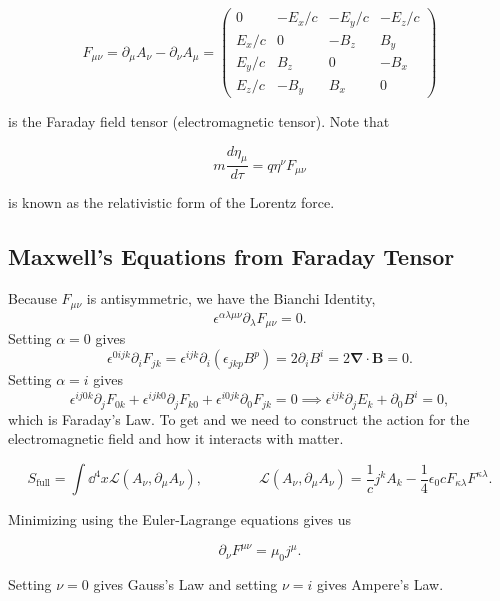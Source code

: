 \documentclass{article}
\numberwithin{equation}{subsection}
\begin{document}
\begin{meq}
    \begin{equation}
        F_{\mu\nu} = \partial_\mu A_\nu - \partial_\nu A_\mu = \begin{pmatrix}
            0  & -E_x/c & -E_y/c & -E_z/c \\
            E_x/c & 0 & -B_z & B_y \\
            E_y/c & B_z & 0 & -B_x \\
            E_z/c & -B_y & B_x & 0
        \end{pmatrix}
    \end{equation}
\end{meq}
is the Faraday field tensor (electromagnetic tensor). Note that
\begin{meq}
    \begin{equation}
        m\frac{d\eta_\mu}{d\tau} = q\eta^\nu F_{\mu\nu}
    \end{equation}
\end{meq}
is known as the relativistic form of the Lorentz force.
\subsection{Maxwell's Equations from Faraday Tensor}
Because $F_{\mu\nu}$ is antisymmetric, we have the Bianchi Identity,
\begin{equation*}
    \epsilon^{\alpha\lambda\mu\nu}\partial_\lambda F_{\mu\nu} = 0.
\end{equation*}
Setting $\alpha = 0$ gives 
\begin{equation*}
    \epsilon^{0ijk}\partial_i F_{jk} =\epsilon^{ijk}\partial_i(\epsilon_{jkp}B^p) = 2\partial_i B^i = 2\bm{\nabla}\cdot \bm{B} = 0.
\end{equation*}
Setting $\alpha = i$ gives 
\begin{equation*}
    \epsilon^{ij0k}\partial_j F_{0k} + \epsilon^{ijk0}\partial_j F_{k0} + \epsilon^{i0jk}\partial_0 F_{jk} = 0 \implies \epsilon^{ijk}\partial_j E_k + \partial_0 B^i = 0,
\end{equation*}
which is Faraday's Law. To get  and  we need to construct the action for the electromagnetic field and how it interacts with matter.
\begin{meq}
    \begin{equation}
        S_\text{full} = \int \dd^4x \mathcal{L}(A_\nu, \partial_\mu A_\nu),\quad\quad\quad\quad \mathcal{L}(A_\nu, \partial_\mu A_\nu) = \frac{1}{c}j^k A_k - \frac{1}{4}\epsilon_0 cF_{\kappa \lambda}F^{\kappa \lambda}.
    \end{equation}
\end{meq}
Minimizing using the Euler-Lagrange equations gives us 
\begin{meq}
    \begin{equation}
        \partial_\nu F^{\mu\nu} = \mu_0 j^\mu.
    \end{equation}
\end{meq}
Setting $\nu = 0$ gives Gauss's Law and setting $\nu = i$ gives Ampere's Law.
\end{document}
